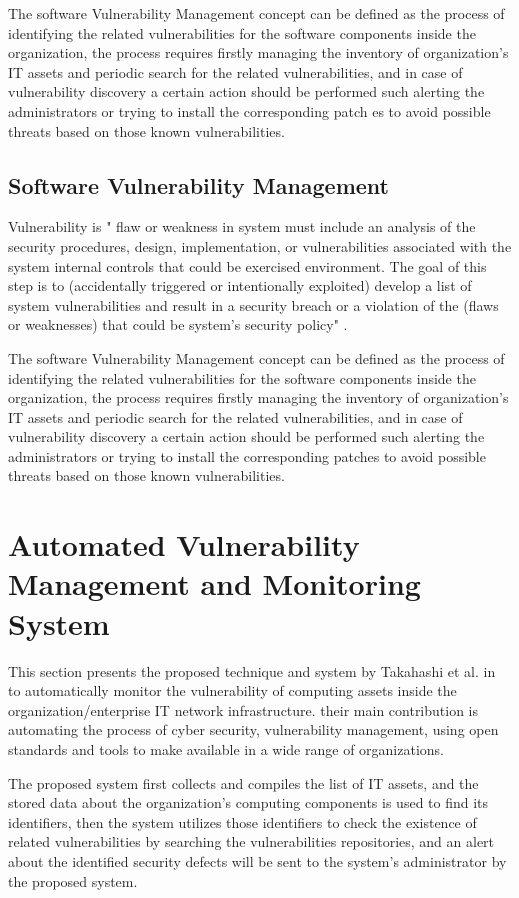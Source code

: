 \documentclass{llncs}
\begin{document}
\par The software Vulnerability Management concept can be defined as the process of identifying the related vulnerabilities for the software components inside the organization, the process requires firstly managing the inventory of organization's IT assets and periodic search for the related vulnerabilities, and in case of vulnerability discovery a certain action should be performed such alerting the administrators or trying to install the corresponding patch es to avoid possible threats based on those known vulnerabilities.
         
\subsection{Software Vulnerability Management}

\par Vulnerability is " flaw or weakness in system must include an analysis of the security procedures, design, implementation, or vulnerabilities associated with the system internal controls that could be exercised environment. The goal of this step is to (accidentally triggered or intentionally exploited) develop a list of system vulnerabilities and result in a security breach or a violation of the (flaws or weaknesses) that could be system’s security policy" \cite{vuln}.  
\par The software Vulnerability Management concept can be defined as the process of identifying the related vulnerabilities for the software components inside the organization, the process requires firstly managing the inventory of organization's IT assets and periodic search for the related vulnerabilities, and in case of vulnerability discovery a certain action should be performed such alerting the administrators or trying to install the corresponding patches to avoid possible threats based on those known vulnerabilities.    
\newpage
\section{Automated Vulnerability Management and Monitoring System}

\par This section presents the proposed technique and system by Takahashi et al. in \cite{paper1} to automatically monitor the vulnerability of computing assets inside the organization/enterprise IT network infrastructure. their main contribution is automating the process of cyber security, vulnerability management, using open standards and tools to make available in a wide range of organizations.
\par
 The proposed system first collects and compiles the list of IT assets, and the stored data about the organization's computing components is used to find its identifiers, then the system utilizes those identifiers to check the existence of related vulnerabilities by searching the vulnerabilities repositories, and an alert about the identified security defects will be sent to the system's administrator by the proposed system.
    
\end{document}
